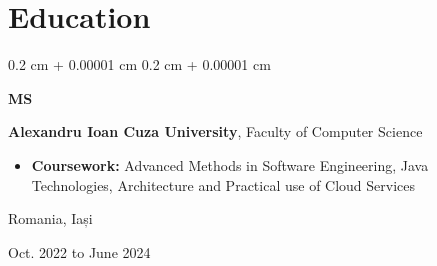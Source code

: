 \documentclass[10pt, letterpaper]{article}
\newenvironment{highlights}{
    \begin{itemize}[
        topsep=0.10 cm,
        parsep=0.10 cm,
        partopsep=0pt,
        itemsep=0pt,
        leftmargin=0.4 cm + 10pt
    ]
}{
    \end{itemize}
} %
\newenvironment{highlightsforbulletentries}{
    \begin{itemize}[
        topsep=0.10 cm,
        parsep=0.10 cm,
        partopsep=0pt,
        itemsep=0pt,
        leftmargin=10pt
    ]
}{
    \end{itemize}
} %
\newenvironment{onecolentry}{
    \begin{adjustwidth}{
        0.2 cm + 0.00001 cm
    }{
        0.2 cm + 0.00001 cm
    }
}{
    \end{adjustwidth}
} %
\newenvironment{threecolentry}[3][]{
    \onecolentry
    \def\thirdColumn{#3}
    \setcolumnwidth{1 cm, \fill, 4.5 cm}
    \begin{paracol}{3}
    {\raggedright #2} \switchcolumn
}{
    \switchcolumn \raggedleft \thirdColumn
    \end{paracol}
    \endonecolentry
} %
\let\hrefWithoutArrow\href
\renewcommand{\href}[2]{\hrefWithoutArrow{#1}{\mbox{\ifthenelse{\equal{#2}{}}{ }{#2 }\raisebox{.15ex}{\footnotesize \faExternalLink*}}}}
\begin{document}
    









    \section{Education}



        
        \begin{threecolentry}{\textbf{MS}}{ 
            Romania, Iași
            
            Oct. 2022 to June 2024 
        }
            \textbf{Alexandru Ioan Cuza University}, Faculty of Computer Science
            \begin{highlights}
                \item \textbf{Coursework:} Advanced Methods in 
                Software Engineering, Java Technologies, Architecture and Practical use of Cloud Services
            \end{highlights}
        \end{threecolentry}


       \vspace{0.2 cm}
\end{document}

